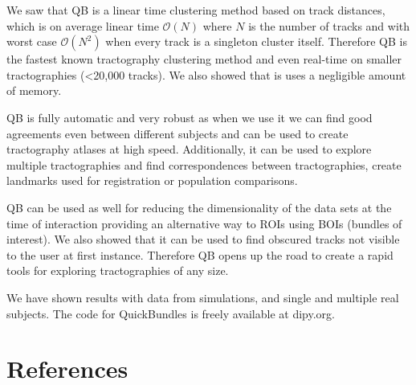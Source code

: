 \documentclass[preprint,authoryear,a4paper,10pt,onecolumn]{elsarticle}
\begin{document}
We saw that QB is a linear time clustering method based on track
distances, which is on average linear time $\mathcal{O}(N)$ where $N$ is
the number of tracks and with worst case $\mathcal{O}(N^{2})$ when every
track is a singleton cluster itself. Therefore QB is the fastest known
tractography clustering method and even real-time on smaller
tractographies (<20,000 tracks). We also showed that is uses a negligible amount of
memory.

QB is fully automatic and very robust as when we use it we can find good
agreements even between different subjects and can be used to create
tractography atlases at high speed. Additionally, it can be used to
explore multiple tractographies and find correspondences between
tractographies, create landmarks used for registration or population
comparisons.

QB can be used as well for reducing the dimensionality of the data sets
at the time of interaction providing an alternative way to ROIs using
BOIs (bundles of interest). We also showed
that it can be used to find obscured tracks not visible to the user
at first instance. Therefore QB opens up the road to create a rapid
tools for exploring tractographies of any size.

We have shown results with data from simulations, and single and
multiple real subjects. The code for QuickBundles is freely available at
dipy.org.

\section{References}

%


\end{document}

